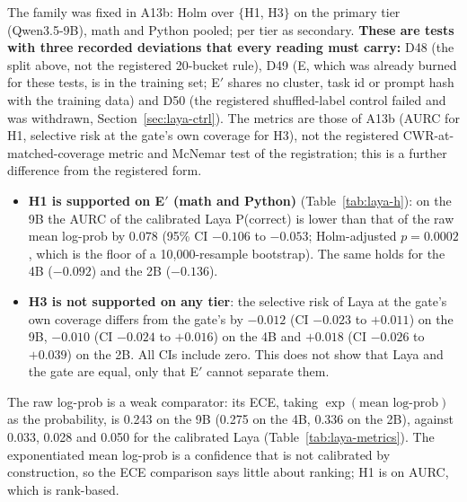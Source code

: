 \documentclass[11pt,a4paper]{article}
\begin{document}
The family was fixed in A13b: Holm over $\{$H1, H3$\}$ on the primary tier (Qwen3.5-9B), math and Python pooled; per tier as
secondary. \textbf{These are tests with three recorded deviations that every reading must carry:}
D48 (the split above, not the registered 20-bucket rule), D49 (E, which was already burned for these tests, is in the training set;
E$'$ shares no cluster, task id or prompt hash with the training data) and D50 (the registered shuffled-label control
failed and was withdrawn, Section~\ref{sec:laya-ctrl}). The metrics are those of A13b (AURC for H1, selective risk at the gate's own
coverage for H3), not the registered CWR-at-matched-coverage metric and McNemar test of the registration; this is a further difference
from the registered form.

\begin{itemize}
\item \textbf{H1 is supported on E$'$ (math and Python)} (Table~\ref{tab:laya-h}): on the 9B the AURC of the calibrated Laya P(correct) is lower than that of the raw
  mean log-prob by $0.078$ (95\% CI $-0.106$ to $-0.053$; Holm-adjusted $p=0.0002$, which is the floor of a 10,000-resample bootstrap). The same
  holds for the 4B ($-0.092$) and the 2B ($-0.136$).
\item \textbf{H3 is not supported on any tier}: the selective risk of Laya at the gate's own coverage differs from the gate's by $-0.012$
  (CI $-0.023$ to $+0.011$) on the 9B, $-0.010$ (CI $-0.024$ to $+0.016$) on the 4B and $+0.018$ (CI $-0.026$ to $+0.039$) on the 2B.
  All CIs include zero. This does not show that Laya and the gate are equal, only that E$'$ cannot separate them.
\end{itemize}
The raw log-prob is a weak comparator: its ECE, taking $\exp(\text{mean log-prob})$ as the probability, is 0.243 on the 9B (0.275 on the 4B, 0.336 on the 2B), against 0.033, 0.028 and 0.050 for the calibrated Laya (Table~\ref{tab:laya-metrics}). The exponentiated mean log-prob is a confidence that is not calibrated by construction, so the ECE comparison says little about ranking; H1 is on AURC, which is rank-based.
\end{document}

